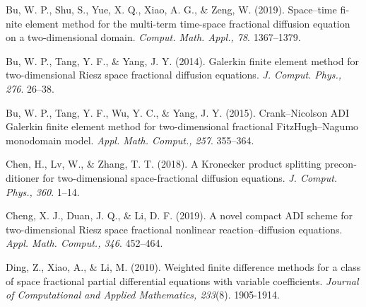 
\begin{latin}

\begin{thebibliography}{99}
\thispagestyle{empty}
Bu, W. P., Shu, S., Yue, X. Q., Xiao, A. G., \& Zeng, W.  
(2019).
Space–time finite element method for the multi-term time-space fractional diffusion equation on a two-dimensional domain.
\textit{Comput. Math. Appl., 78}.
1367–1379.

Bu, W. P., Tang, Y. F., \& Yang, J. Y.
(2014).
Galerkin finite element method for two-dimensional Riesz space fractional diffusion equations.
\textit{J. Comput. Phys., 276}.
26–38.

Bu, W. P., Tang, Y. F., Wu, Y. C., \& Yang, J. Y.
(2015).
Crank–Nicolson ADI Galerkin finite element method for two-dimensional fractional FitzHugh–Nagumo monodomain model.
\textit{Appl. Math. Comput., 257}.
355–364.

Chen, H., Lv, W., \& Zhang, T. T.
(2018).
A Kronecker product splitting preconditioner for two-dimensional space-fractional diffusion equations.
\textit{J. Comput. Phys., 360}.
1–14.

Cheng, X. J., Duan, J. Q., \& Li, D. F.
(2019).
A novel compact ADI scheme for two-dimensional Riesz space fractional nonlinear reaction–diffusion equations.
\textit{Appl. Math. Comput., 346}.
452–464.

Ding, Z., Xiao, A., \& Li, M.
(2010).
Weighted finite difference methods for a class of space fractional partial differential equations with variable coefficients.
\textit{Journal of Computational and Applied Mathematics, 233}(8).
1905-1914.


\end{thebibliography}
\end{latin}
